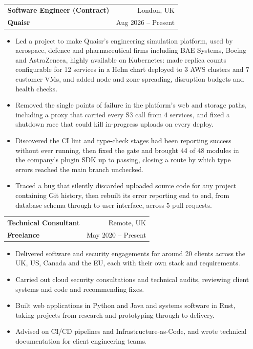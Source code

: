 \documentclass[letterpaper,9pt]{extarticle}
\makeatletter
\newcommand{\spell}[2]{#2}
\newcommand{\spell}[2]{#1}
\newcommand{\resumeSubheading}[4]{%
  \item
    \begin{tabular*}{\textwidth}[t]{l@{\extracolsep{\fill}}r}
      \textbf{#1} & #2 \\
      {\small #3} & {\small #4}
    \end{tabular*}%
}
\newcommand{\resumeItemListStart}{%
  \begin{itemize}[leftmargin=11pt,labelsep=5pt,itemsep=2.5pt,parsep=0pt,%
                  topsep=3pt,partopsep=0pt]}
\newcommand{\resumeItemListEnd}{\end{itemize}}
\makeatother
\begin{document}
  \resumeSubheading
    {Software Engineer (Contract)}{London, UK}
    {\textbf{Quaisr}}{Aug 2026 -- Present}
    \resumeItemListStart
      \item {Led a project to make Quaisr's engineering simulation
        platform, used by aerospace, \spell{defense}{defence} and
        pharmaceutical firms including BAE Systems, Boeing and AstraZeneca,
        highly available on Kubernetes: made replica counts configurable for
        12 services in a Helm chart deployed to 3 AWS clusters and 7 customer
        VMs, and added node and zone spreading, disruption budgets and health
        checks.}
      \item {Removed the single points of failure in the platform's web and
        storage paths, including a proxy that carried every S3 call from 4
        services, and fixed a shutdown race that could kill in-progress uploads
        on every deploy.}
      \item {Discovered the CI lint and type-check stages had been reporting
        success without ever running, then fixed the gate and brought 44 of 48
        modules in the company's plugin SDK up to passing, closing a route by
        which type errors reached the main branch unchecked.}
      \item {Traced a bug that silently discarded uploaded source code for any
        project containing Git history, then rebuilt its error reporting end to
        end, from database schema through to user interface, across 5 pull
        requests.}
    \resumeItemListEnd

  \resumeSubheading
    {Technical Consultant}{Remote, UK}
    {\textbf{Freelance}}{May 2020 -- Present}
    \resumeItemListStart
      \item {Delivered software and security engagements for around 20
        clients across the UK, US, Canada and the EU, each with their own stack and
        requirements.}
      \item {Carried out cloud security consultations and technical audits,
        reviewing client systems and code and recommending fixes.}
      \item {Built web applications in Python and Java and systems software in
        Rust, taking projects from research and prototyping through to
        delivery.}
      \item {Advised on CI/CD pipelines and Infrastructure-as-Code, and wrote
        technical documentation for client engineering teams.}
    \resumeItemListEnd
\end{document}
